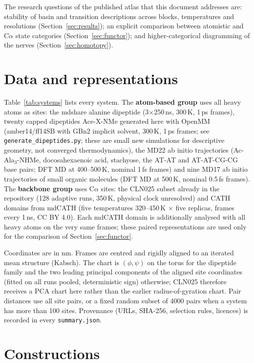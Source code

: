 \documentclass[11pt]{article}
\begin{document}
The research questions of the published atlas that this document addresses are: stability of basin and transition descriptions across blocks, temperatures and resolutions (Section~\ref{sec:results}); an explicit comparison between atomistic and C$\alpha$ state categories (Section~\ref{sec:functor}); and higher-categorical diagramming of the nerves (Section~\ref{sec:homotopy}).

\section{Data and representations}\label{sec:data}
Table~\ref{tab:systems} lists every system. The \textbf{atom-based group} uses all heavy atoms as sites: the mdshare alanine dipeptide (3$\times$250\,ns, 300\,K, 1\,ps frames), twenty capped dipeptides Ace-X-NMe generated here with OpenMM (amber14/ff14SB with GBn2 implicit solvent, 300\,K, 1\,ps frames; see \texttt{generate\_dipeptides.py}; these are small new simulations for descriptive geometry, not converged thermodynamics), the MD22 ab initio trajectories (Ac-Ala$_3$-NHMe, docosahexaenoic acid, stachyose, the AT-AT and AT-AT-CG-CG base pairs; DFT MD at 400--500\,K, nominal 1\,fs frames) and nine MD17 ab initio trajectories of small organic molecules (DFT MD at 500\,K, nominal 0.5\,fs frames). The \textbf{backbone group} uses C$\alpha$ sites: the CLN025 subset already in the repository (128 adaptive runs, 350\,K, physical clock unresolved) and \nMdcath{} CATH domains from mdCATH (five temperatures 320--450\,K $\times$ five replicas, frames every 1\,ns, CC BY 4.0). Each mdCATH domain is additionally analysed with all heavy atoms on the very same frames; these paired representations are used only for the comparison of Section~\ref{sec:functor}.

Coordinates are in nm. Frames are centred and rigidly aligned to an iterated mean structure (Kabsch). The chart is $(\phi,\psi)$ on the torus for the dipeptide family and the two leading principal components of the aligned site coordinates (fitted on all runs pooled, deterministic sign) otherwise; CLN025 therefore receives a PCA chart here rather than the earlier radius-of-gyration chart. Pair distances use all site pairs, or a fixed random subset of 4000 pairs when a system has more than 100 sites. Provenance (URLs, SHA-256, selection rules, licences) is recorded in every \texttt{summary.json}.



\section{Constructions}\label{sec:constructions}
\end{document}
